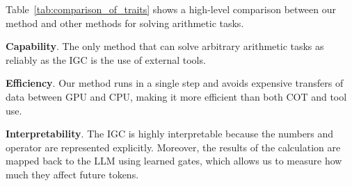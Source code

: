 \documentclass[11pt]{article}
\begin{document}
Table~\ref{tab:comparison_of_traits} shows a high-level comparison between our method and other methods for solving arithmetic tasks.

\textbf{Capability}.
The only method that can solve arbitrary arithmetic tasks as reliably as the IGC is the use of external tools.

\textbf{Efficiency}.
Our method runs in a single step and avoids expensive transfers of data between GPU and CPU, making it more efficient than both COT and tool use.

\textbf{Interpretability}.
The IGC is highly interpretable because the numbers and operator are represented explicitly.
Moreover, the results of the calculation are mapped back to the LLM using learned gates, which allows us to measure how much they affect future tokens.
\end{document}
